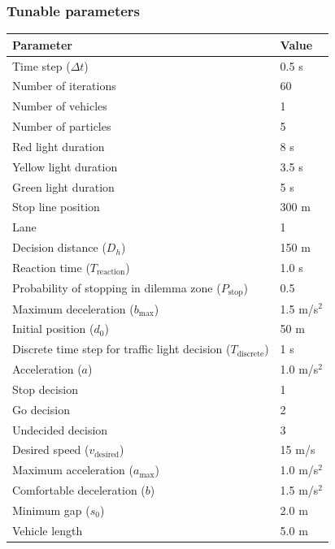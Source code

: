 \subsubsection{Tunable parameters}
\begin{table}[htbp]
    \centering
    \begin{tabular}{|l|l|}
        \hline
        \textbf{Parameter} & \textbf{Value} \\ \hline
        Time step ($\Delta t$) & 0.5 s \\ \hline
        Number of iterations & 60 \\ \hline
        Number of vehicles & 1 \\ \hline
        Number of particles & 5 \\ \hline
        Red light duration & 8 s \\ \hline
        Yellow light duration & 3.5 s \\ \hline
        Green light duration & 5 s \\ \hline
        Stop line position & 300 m \\ \hline
        Lane & 1 \\ \hline
        Decision distance ($D_h$) & 150 m \\ \hline
        Reaction time ($T_{\text{reaction}}$) & 1.0 s \\ \hline
        Probability of stopping in dilemma zone ($P_{\text{stop}}$) & 0.5 \\ \hline
        Maximum deceleration ($b_{\text{max}}$) & 1.5 m/s\(^2\) \\ \hline
        Initial position ($d_0$) & 50 m \\ \hline
        Discrete time step for traffic light decision ($T_{\text{discrete}}$) & 1 s \\ \hline
        Acceleration ($a$) & 1.0 m/s\(^2\) \\ \hline
        Stop decision & 1 \\ \hline
        Go decision & 2 \\ \hline
        Undecided decision & 3 \\ \hline
        Desired speed ($v_{\text{desired}}$) & 15 m/s \\ \hline
        Maximum acceleration ($a_{\text{max}}$) & 1.0 m/s\(^2\) \\ \hline
        Comfortable deceleration ($b$) & 1.5 m/s\(^2\) \\ \hline
        Minimum gap ($s_0$) & 2.0 m \\ \hline
        Vehicle length & 5.0 m \\ \hline

\end{tabular}
\end{table}
